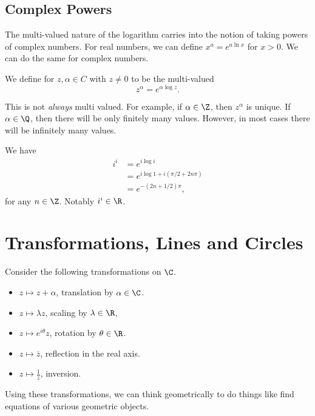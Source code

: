 \subsection{Complex Powers}

The multi-valued nature of the logarithm carries into the notion of taking powers of complex numbers.
For real numbers, we can define $x^a = e^{a \ln x}$ for $x > 0$. We can do the same for complex numbers.

\begin{definition}
	We define  for $z, \alpha \in C$ with $z \neq 0$ to be the multi-valued
	$$
	z^{\alpha} = e^{\alpha \log z}.
	$$
\end{definition}

This is not \emph{always} multi valued. For example, if $\alpha \in \Z$, then $z^\alpha$ is unique. If $\alpha \in \Q$, then there will be only finitely many values. However, in most cases there will be infinitely many values.

\begin{example}[Calculating $i^i$]
	We have
	\begin{align*}
		i^i &= e^{i \log i} \\
		&= e^{i \log 1 + i(\pi/2 + 2n\pi)} \\
		&= e^{-(2n + 1/2)\pi},
	\end{align*}
	for any $n \in \Z$. Notably $i^i \in \R$.
\end{example}


\section{Transformations, Lines and Circles}

Consider the following transformations on $\C$.
\begin{itemize}
	\item $z \mapsto z + \alpha$, translation by $\alpha \in \C$.
	\item $z \mapsto \lambda z$, scaling by $\lambda \in \R$,
	\item $z \mapsto e^{i \theta} z$, rotation by $\theta \in \R$. 
	\item $z \mapsto \overline{z}$, reflection in the real axis.
	\item $z \mapsto \frac{1}{z}$, inversion.
\end{itemize}
Using these transformations, we can think geometrically to do things like find equations of various geometric objects.

